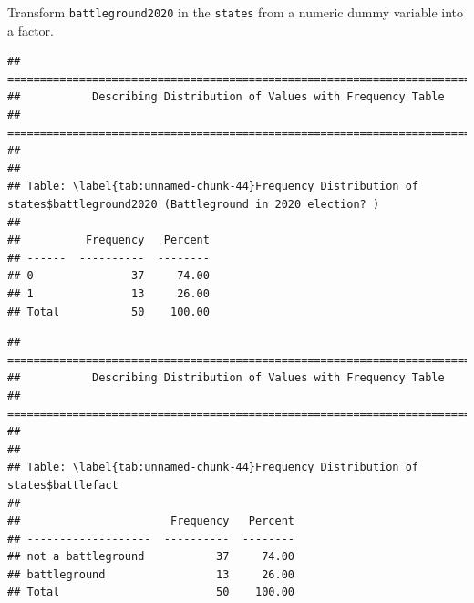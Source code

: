 \documentclass[
]{book}
\newenvironment{Shaded}{\begin{snugshade}}{\end{snugshade}}
\newcommand{\AttributeTok}[1]{\textcolor[rgb]{0.13,0.29,0.53}{#1}}
\newcommand{\CommentTok}[1]{\textcolor[rgb]{0.56,0.35,0.01}{\textit{#1}}}
\newcommand{\FunctionTok}[1]{\textcolor[rgb]{0.13,0.29,0.53}{\textbf{#1}}}
\newcommand{\NormalTok}[1]{#1}
\newcommand{\OtherTok}[1]{\textcolor[rgb]{0.56,0.35,0.01}{#1}}
\newcommand{\SpecialCharTok}[1]{\textcolor[rgb]{0.81,0.36,0.00}{\textbf{#1}}}
\newcommand{\StringTok}[1]{\textcolor[rgb]{0.31,0.60,0.02}{#1}}
\begin{document}
Transform \texttt{battleground2020} in the \texttt{states} from a numeric dummy variable into a factor.

\begin{Shaded}
\end{Shaded}

\begin{verbatim}
## ===========================================================================
##           Describing Distribution of Values with Frequency Table
## ===========================================================================
## 
## 
## Table: \label{tab:unnamed-chunk-44}Frequency Distribution of states$battleground2020 (Battleground in 2020 election? )
## 
##          Frequency   Percent
## ------  ----------  --------
## 0               37     74.00
## 1               13     26.00
## Total           50    100.00
\end{verbatim}

\begin{Shaded}
\end{Shaded}

\begin{verbatim}
## ===========================================================================
##           Describing Distribution of Values with Frequency Table
## ===========================================================================
## 
## 
## Table: \label{tab:unnamed-chunk-44}Frequency Distribution of states$battlefact
## 
##                       Frequency   Percent
## -------------------  ----------  --------
## not a battleground           37     74.00
## battleground                 13     26.00
## Total                        50    100.00
\end{verbatim}
\end{document}
